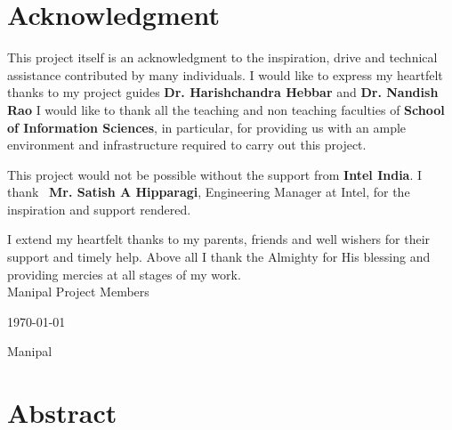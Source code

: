 \documentclass{mainreport}
\begin{document}
\maketitle
\makecertificate

\parindent 10mm
\chapter*{Acknowledgment}\label{ack}
{\label{ack} 

\hspace{6mm} This project itself is an acknowledgment to the inspiration, drive and technical
assistance contributed by many individuals. I would like to express my heartfelt thanks to my project guides 
{\bf Dr. Harishchandra Hebbar} and {\bf Dr. Nandish Rao}
I would like to thank all the teaching and non teaching faculties of {\bf School of Information Sciences}, 
in particular, for providing us with an ample environment and
infrastructure required to carry out this project. 

This project would not be possible without the support from {\bf Intel India}. I thank \
{\bf Mr. Satish A Hipparagi}, Engineering Manager at Intel,
for the inspiration and support rendered.

I extend my heartfelt thanks to my parents, friends and well wishers for their 
support and timely help. Above all I thank the Almighty for His blessing and 
providing mercies at all stages of my work. \\[2cm]




\noindent Manipal \hfill Project Members

\noindent \today \hfill \institutename

 \hfill Manipal





}

\chapter*{Abstract}\label{Abstract}
\end{document}
